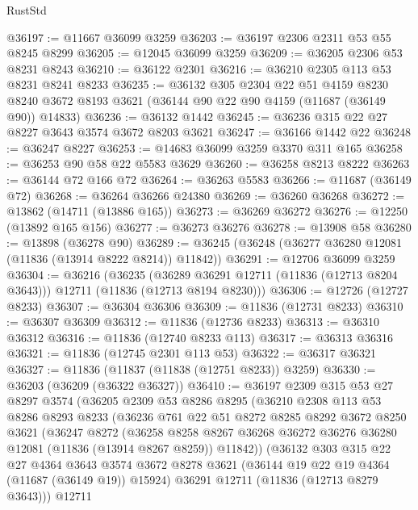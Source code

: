 \begin{lexlean}{RustStd}
\begin{coremodule}
@36197 := @11667 @36099 @3259
@36203 := @36197 @2306 @2311 @53 @55 @8245 @8299
@36205 := @12045 @36099 @3259
@36209 := @36205 @2306 @53 @8231 @8243
@36210 := @36122 @2301
@36216 := @36210 @2305 @113 @53 @8231 @8241 @8233
@36235 := @36132
    @305
    @2304
    @22
    @51
    @4159
    @8230
    @8240
    @3672
    @8193
    @3621
    (@36144 @90 @22 @90 @4159 (@11687 (@36149 @90)) @14833)
@36236 := @36132 @1442
@36245 := @36236 @315 @22 @27 @8227 @3643 @3574 @3672 @8203 @3621
@36247 := @36166 @1442 @22
@36248 := @36247 @8227
@36253 := @14683 @36099 @3259 @3370 @311 @165
@36258 := @36253 @90 @58 @22 @5583 @3629
@36260 := @36258 @8213 @8222
@36263 := @36144 @72 @166 @72
@36264 := @36263 @5583
@36266 := @11687 (@36149 @72)
@36268 := @36264 @36266 @24380
@36269 := @36260 @36268
@36272 := @13862 (@14711 (@13886 @165))
@36273 := @36269 @36272
@36276 := @12250 (@13892 @165 @156)
@36277 := @36273 @36276
@36278 := @13908 @58
@36280 := @13898 (@36278 @90)
@36289 := @36245 (@36248 (@36277 @36280 @12081 (@11836 (@13914 @8222 @8214)) @11842))
@36291 := @12706 @36099 @3259
@36304 := @36216
    (@36235
      (@36289 @36291 @12711 (@11836 (@12713 @8204 @3643)))
      @12711
      (@11836 (@12713 @8194 @8230)))
@36306 := @12726 (@12727 @8233)
@36307 := @36304 @36306
@36309 := @11836 (@12731 @8233)
@36310 := @36307 @36309
@36312 := @11836 (@12736 @8233)
@36313 := @36310 @36312
@36316 := @11836 (@12740 @8233 @113)
@36317 := @36313 @36316
@36321 := @11836 (@12745 @2301 @113 @53)
@36322 := @36317 @36321
@36327 := @11836 (@11837 (@11838 (@12751 @8233)) @3259)
@36330 := @36203 (@36209 (@36322 @36327))
@36410 := @36197
    @2309
    @315
    @53
    @27
    @8297
    @3574
    (@36205
      @2309
      @53
      @8286
      @8295
      (@36210
        @2308
        @113
        @53
        @8286
        @8293
        @8233
        (@36236
          @761
          @22
          @51
          @8272
          @8285
          @8292
          @3672
          @8250
          @3621
          (@36247
            @8272
            (@36258
              @8258
              @8267
              @36268
              @36272
              @36276
              @36280
              @12081
              (@11836 (@13914 @8267 @8259))
              @11842))
          (@36132
            @303
            @315
            @22
            @27
            @4364
            @3643
            @3574
            @3672
            @8278
            @3621
            (@36144 @19 @22 @19 @4364 (@11687 (@36149 @19)) @15924)
            @36291
            @12711
            (@11836 (@12713 @8279 @3643)))
          @12711

\end{coremodule}
\end{lexlean}
